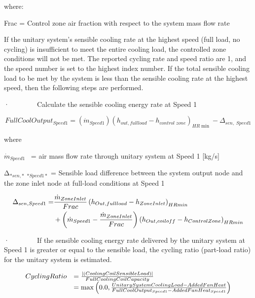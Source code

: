 where:

Frac = Control zone air fraction with respect to the system mass flow rate

If the unitary system's sensible cooling rate at the highest speed (full load, no cycling) is insufficient to meet the entire cooling load, the controlled zone conditions will not be met. The reported cycling rate and speed ratio are 1, and the speed number is set to the highest index number. If the total sensible cooling load to be met by the system is less than the sensible cooling rate at the highest speed, then the following steps are performed.

·~~~~~~~~Calculate the sensible cooling energy rate at Speed 1

\begin{equation}
FullCoolOutpu{t_{Speed1}} = ({\dot m_{Speed1}}){({h_{out,fullload}} - {h_{control\;zone}})_{HR\min }} - {\Delta_{sen,\;Speed1}}
\end{equation}

where

\emph{\({\dot m_{Speed1}}\)}~ = air mass flow rate through unitary system at Speed 1 {[}kg/s{]}

Δ\(_{*sen,*}\) \(_{*Speed1*}\) = Sensible load difference between the system output node and the zone inlet node at full-load conditions at Speed 1

\begin{equation}
  \begin{split}
    \Delta_{sen,Speed1} =& \frac{\dot{m}_{ZoneInlet}}{Frac} \PB{h_{Out,full load} - h_{ZoneInlet}}_{HRmin} \\
                              &+ \PB{\dot{m}_{Speed1} - \frac{\dot{m}_{ZoneInlet}}{Frac}} \PB{h_{Out,coil off} - h_{ControlZone}}_{HRmin}
  \end{split}
\end{equation}

·~~~~~~~~If the sensible cooling energy rate delivered by the unitary system at Speed 1 is greater or equal to the sensible load, the cycling ratio (part-load ratio) for the unitary system is estimated.

\begin{equation}
  \begin{array}{rl}
    CyclingRatio &= \frac{ \left| \PB{CoolingCoilSensibleLoad} \right| } {FullCoolingCoilCapacity} \\ 
                 &= \max \PB{0.0,\frac{UnitarySystemCoolingLoad - AddedFanHeat}{FullCoolOutput_{Speed1} - AddedFanHeat_{Speed1}}}
  \end{array}
\end{equation}

